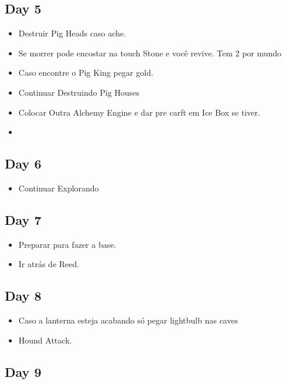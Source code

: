 \documentclass{article}
\begin{document}
\subsection{Day 5}
\begin{itemize}
    \item Destruir Pig Heads caso ache.
    \item Se morrer pode encostar na touch Stone e você revive. Tem 2 por mundo
    \item Caso encontre o Pig King pegar gold.
    \item Continuar Destruindo Pig Houses
    \item Colocar Outra Alchemy Engine e dar pre carft em Ice Box se tiver.
    \item 
\end{itemize}


\subsection{Day 6}
\begin{itemize}
        \item Continuar Explorando
\end{itemize}

\subsection{Day 7}
\begin{itemize}
        \item Preparar para fazer a base.
        \item Ir atrás de Reed.
\end{itemize}

\subsection{Day 8}
\begin{itemize}
    \item Caso a lanterna esteja acabando só pegar lightbulb nas caves
    \item Hound Attack.
\end{itemize}

\subsection{Day 9}
\end{document}
